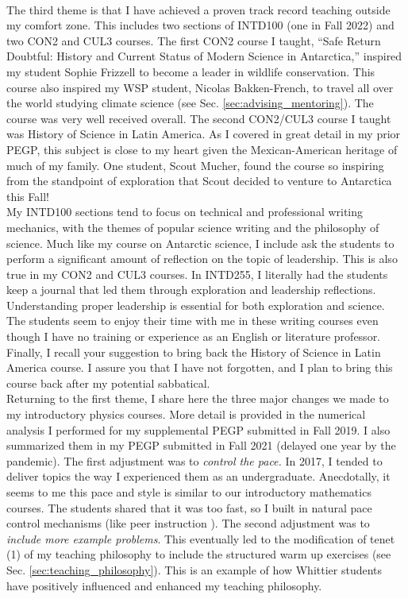 \documentclass[../../../main.tex]{subfiles}
\begin{document}
\\
\vspace{0.25cm}
The third theme is that I have achieved a proven track record teaching outside my comfort zone.  This includes two sections of INTD100 (one in Fall 2022) and two CON2 and CUL3 courses.  The first CON2 course I taught, ``Safe Return Doubtful: History and Current Status of Modern Science in Antarctica,'' inspired my student Sophie Frizzell to become a leader in wildlife conservation.  This course also inspired my WSP student, Nicolas Bakken-French, to travel all over the world studying climate science (see Sec. \ref{sec:advising_mentoring}).  The course was very well received overall.  The second CON2/CUL3 course I taught was History of Science in Latin America.  As I covered in great detail in my prior PEGP, this subject is close to my heart given the Mexican-American heritage of much of my family.  One student, Scout Mucher, found the course so inspiring from the standpoint of exploration that Scout decided to venture to Antarctica this Fall!
\\
\vspace{0.25cm}
My INTD100 sections tend to focus on technical and professional writing mechanics, with the themes of popular science writing and the philosophy of science.  Much like my course on Antarctic science, I include ask the students to perform a significant amount of reflection on the topic of leadership.  This is also true in my CON2 and CUL3 courses.  In INTD255, I literally had the students keep a journal that led them through exploration and leadership reflections.  Understanding proper leadership is essential for both exploration and science.  The students seem to enjoy their time with me in these writing courses even though I have no training or experience as an English or literature professor.  Finally, I recall your suggestion to bring back the History of Science in Latin America course.  I assure you that I have not forgotten, and I plan to bring this course back after my potential sabbatical.
\\
\vspace{0.25cm}
Returning to the first theme, I share here the three major changes we made to my introductory physics courses.  More detail is provided in the numerical analysis I performed for my supplemental PEGP submitted in Fall 2019.  I also summarized them in my PEGP submitted in Fall 2021 (delayed one year by the pandemic).  The first adjustment was to \textit{control the pace.}  In 2017, I tended to deliver topics the way I experienced them as an undergraduate.  Anecdotally, it seems to me this pace and style is similar to our introductory mathematics courses.  The students shared that it was too fast, so I built in natural pace control mechanisms (like peer instruction \cite{mazur2013peer}).  The second adjustment was to \textit{include more example problems}.  This eventually led to the modification of tenet (1) of my teaching philosophy to include the structured warm up exercises (see Sec. \ref{sec:teaching_philosophy}).  This is an example of how Whittier students have positively influenced and enhanced my teaching philosophy.
\end{document}
